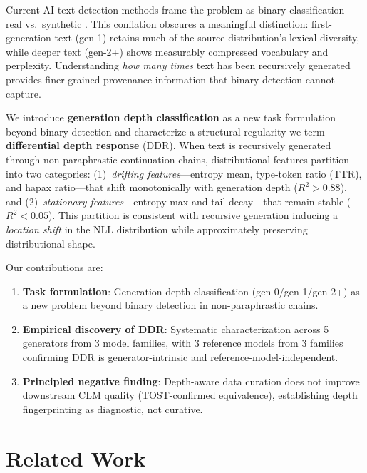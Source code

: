 \documentclass[11pt]{article}
\begin{document}
Current AI text detection methods frame the problem as binary classification---real vs.\ synthetic \cite{mitchell2023detectgpt, bao2024fastdetectgpt, hans2024binoculars}. This conflation obscures a meaningful distinction: first-generation text (gen-1) retains much of the source distribution's lexical diversity, while deeper text (gen-2+) shows measurably compressed vocabulary and perplexity. Understanding \emph{how many times} text has been recursively generated provides finer-grained provenance information that binary detection cannot capture.

We introduce \textbf{generation depth classification} as a new task formulation beyond binary detection and characterize a structural regularity we term \textbf{differential depth response} (DDR). When text is recursively generated through non-paraphrastic continuation chains, distributional features partition into two categories: (1)~\emph{drifting features}---entropy mean, type-token ratio (TTR), and hapax ratio---that shift monotonically with generation depth ($R^2 > 0.88$), and (2)~\emph{stationary features}---entropy max and tail decay---that remain stable ($R^2 < 0.05$). This partition is consistent with recursive generation inducing a \emph{location shift} in the NLL distribution while approximately preserving distributional shape.

Our contributions are:
\begin{enumerate}
\item \textbf{Task formulation}: Generation depth classification (gen-0/gen-1/gen-2+) as a new problem beyond binary detection in non-paraphrastic chains.
\item \textbf{Empirical discovery of DDR}: Systematic characterization across 5 generators from 3 model families, with 3 reference models from 3 families confirming DDR is generator-intrinsic and reference-model-independent.
\item \textbf{Principled negative finding}: Depth-aware data curation does not improve downstream CLM quality (TOST-confirmed equivalence), establishing depth fingerprinting as diagnostic, not curative.
\end{enumerate}

\section{Related Work}
\label{sec:related}
\end{document}
